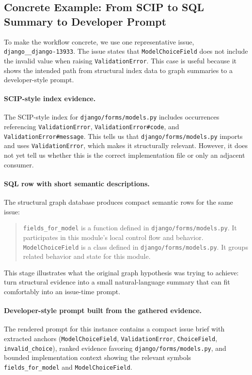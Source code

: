 \documentclass[11pt]{article}
\begin{document}
\subsection{Concrete Example: From SCIP to SQL Summary to Developer Prompt}

To make the workflow concrete, we use one representative issue, \texttt{django\_\_django-13933}. The issue states that \texttt{ModelChoiceField} does not include the invalid value when raising \texttt{ValidationError}. This case is useful because it shows the intended path from structural index data to graph summaries to a developer-style prompt.

\paragraph{SCIP-style index evidence.}
The SCIP-style index for \texttt{django/forms/models.py} includes occurrences referencing \texttt{ValidationError}, \texttt{ValidationError\#code}, and \texttt{ValidationError\#message}. This tells us that \texttt{django/forms/models.py} imports and uses \texttt{ValidationError}, which makes it structurally relevant. However, it does not yet tell us whether this is the correct implementation file or only an adjacent consumer.

\paragraph{SQL row with short semantic descriptions.}
The structural graph database produces compact semantic rows for the same issue:

\begin{quote}
\small
\texttt{fields\_for\_model} is a function defined in \texttt{django/forms/models.py}. It participates in this module's local control flow and behavior.\\
\texttt{ModelChoiceField} is a class defined in \texttt{django/forms/models.py}. It groups related behavior and state for this module.
\end{quote}

This stage illustrates what the original graph hypothesis was trying to achieve: turn structural evidence into a small natural-language summary that can fit comfortably into an issue-time prompt.

\paragraph{Developer-style prompt built from the gathered evidence.}
The rendered prompt for this instance contains a compact issue brief with extracted anchors (\texttt{ModelChoiceField}, \texttt{ValidationError}, \texttt{ChoiceField}, \texttt{invalid\_choice}), ranked evidence favoring \texttt{django/forms/models.py}, and bounded implementation context showing the relevant symbols \texttt{fields\_for\_model} and \texttt{ModelChoiceField}.
\end{document}
